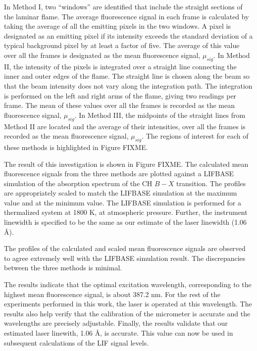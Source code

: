 In Method I, two ``windows'' are identified that include the straight sections of the laminar flame.
The average fluorescence signal in each frame is calculated by taking the average of all the emitting pixels in the two windows.
A pixel is designated as an emitting pixel if its intensity exceeds the standard deviation of a typical background pixel by at least a factor of five.
The average of this value over all the frames is designated as the mean fluorescence signal, \(\mu_{sig}\).
In Method II, the intensity of the pixels is integrated over a straight line connecting the inner and outer edges of the flame.
The straight line is chosen along the beam so that the beam intensity does not vary along the integration path.
The integration is performed on the left and right arms of the flame, giving two readings per frame.
The mean of these values over all the frames is recorded as the mean fluorescence signal, \(\mu_{sig}\).
In Method III, the midpoints of the straight lines from Method II are located and the average of their intensities, over all the frames is recorded as the mean fluorescence signal, \(\mu_{sig}\).
The regions of interest for each of these methods is highlighted in Figure FIXME.

The result of this investigation is shown in Figure FIXME.
The calculated mean fluorescence signals from the three methods are plotted against a LIFBASE simulation of the absorption spectrum of the CH \(B-X\) transition.
The profiles are appropriately scaled to match the LIFBASE simulation at the maximum value and at the minimum value.
The LIFBASE simulation is performed for a thermalized system at 1800 K, at atmospheric pressure.
Further, the instrument linewidth is specified to be the same as our estimate of the laser linewidth (1.06 \AA).

The profiles of the calculated and scaled mean fluorescence signals are observed to agree extremely well with the LIFBASE simulation result.
The discrepancies between the three methods is minimal.

The results indicate that the optimal excitation wavelength, corresponding to the highest mean fluorescence signal, is about 387.2 nm.
For the rest of the experiments performed in this work, the laser is operated at this wavelength.
The results also help verify that the calibration of the micrometer is accurate and the wavelengths are precisely adjustable.
Finally, the results validate that our estimated laser linewith, 1.06 \AA, is accurate.
This value can now be used in subsequent calculations of the LIF signal levels.

